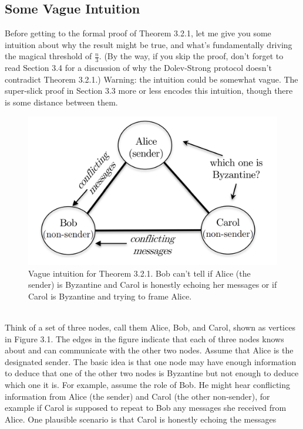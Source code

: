 \subsection{Some Vague Intuition}
Before getting to the formal proof of Theorem 3.2.1, let me give you some intuition about
why the result might be true, and what’s fundamentally driving the magical threshold of
$\frac{n}{3}$. (By the way, if you skip the proof, don’t forget to read Section 3.4 for a discussion of
why the Dolev-Strong protocol doesn't contradict Theorem 3.2.1.) Warning: the intuition could
be somewhat vague. The super-slick proof in Section 3.3 more or less encodes this intuition,
though there is some distance between them.\\
\begin{figure}[h]
    \centering
    \includegraphics[scale = 0.5]{figures/f3.png}
    \caption{Vague intuition for Theorem 3.2.1. Bob can’t tell if Alice (the sender) is Byzantine
and Carol is honestly echoing her messages or if Carol is Byzantine and trying to frame
Alice.}
    \label{fig:mesh1}
\end{figure}\\
Think of a set of three nodes, call them Alice, Bob, and Carol, shown as vertices in
Figure 3.1. The edges in the figure indicate that each of three nodes knows about and can
communicate with the other two nodes. Assume that Alice is the designated sender.
The basic idea is that one node may have enough information to deduce that one of the
other two nodes is Byzantine but not enough to deduce which one it is. For example, assume
the role of Bob. He might hear conflicting information from Alice (the sender) and Carol
(the other non-sender), for example if Carol is supposed to repeat to Bob any messages she
received from Alice. One plausible scenario is that Carol is honestly echoing the messages
